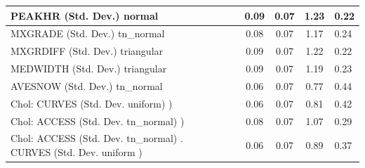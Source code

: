 \begin{table}
\begin{center}
\begin{tabular}{|l|l|c|c|c|l|}
			\hline
			PEAKHR (Std. Dev.) normal &  & 0.09 & 0.07 & 1.23 & 0.22 \\
			\hline
			MXGRADE (Std. Dev.) tn_normal &  & 0.08 & 0.07 & 1.17 & 0.24 \\
			\hline
			MXGRDIFF (Std. Dev.) triangular &  & 0.09 & 0.07 & 1.22 & 0.22 \\
			\hline
			MEDWIDTH (Std. Dev.) triangular &  & 0.09 & 0.07 & 1.19 & 0.23 \\
			\hline
			AVESNOW (Std. Dev.) tn_normal &  & 0.06 & 0.07 & 0.77 & 0.44 \\
			\hline
			 Chol: CURVES (Std. Dev. uniform) ) &  & 0.06 & 0.07 & 0.81 & 0.42 \\
			\hline
			 Chol: ACCESS (Std. Dev. tn_normal) ) &  & 0.08 & 0.07 & 1.07 & 0.29 \\
			\hline
			 Chol: ACCESS (Std. Dev. tn_normal) . CURVES (Std. Dev.   uniform ) &  & 0.06 & 0.07 & 0.89 & 0.37 \\
			\hline
		\end{tabular}
	\end{center}
\end{table}